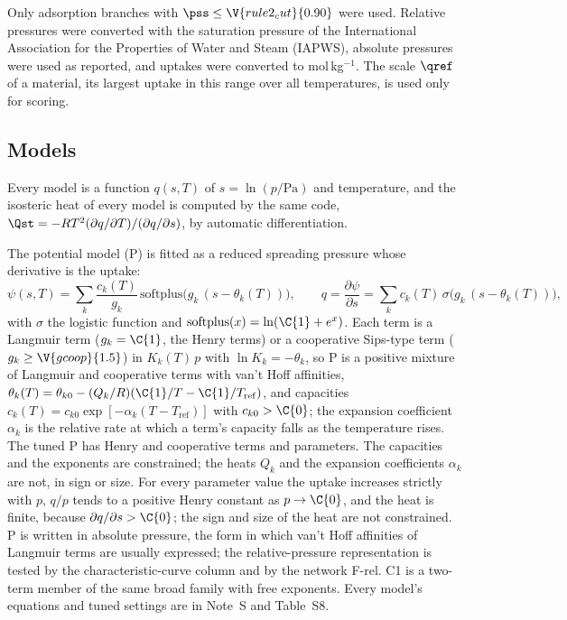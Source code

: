 \documentclass[journal=jcisd8,manuscript=article]{achemso}
\begin{document}
Only adsorption branches with $\pss \le \V{rule2_cut}{0.90}$ were used. Relative pressures were converted with the
saturation pressure of the International Association for the Properties of Water and Steam
(IAPWS)\cite{wagner1993}, absolute pressures were used as reported, and uptakes were converted to
mol\,kg$^{-1}$. The scale $\qref$ of a material, its largest uptake in this range over all temperatures, is used
only for scoring.

\subsection*{Models}

Every model is a function $q(s,T)$ of $s = \ln(p/\mathrm{Pa})$ and temperature, and the isosteric heat of every
model is computed by the same code, $\Qst = -RT^{2}(\partial q/\partial T)/(\partial q/\partial s)$, by automatic
differentiation.

The potential model (P) is fitted as a reduced spreading pressure whose derivative is the uptake:
\begin{equation}
\psi(s,T) = \sum_k \frac{c_k(T)}{g_k}\,\mathrm{softplus}\bigl(g_k\,(s-\theta_k(T))\bigr),
\qquad q = \frac{\partial\psi}{\partial s} = \sum_k c_k(T)\,\sigma\bigl(g_k\,(s-\theta_k(T))\bigr),
\end{equation}
with $\sigma$ the logistic function and $\mathrm{softplus}(x) = \ln(\C{1} + e^{x})$. Each term is a Langmuir term ($g_k = \C{1}$, the Henry terms) or a cooperative
Sips-type term ($g_k \ge \V{gcoop}{1.5}$) in $K_k(T)\,p$ with $\ln K_k = -\theta_k$, so P is a positive mixture of
Langmuir and cooperative terms with van't Hoff affinities,
$\theta_k(T) = \theta_{k0} - (Q_k/R)(\C{1}/T - \C{1}/T_{\mathrm{ref}})$, and capacities
$c_k(T) = c_{k0}\exp[-\alpha_k(T - T_{\mathrm{ref}})]$ with $c_{k0} > \C{0}$; the expansion coefficient
$\alpha_k$ is the relative rate at which a term's capacity falls as the temperature rises. The tuned P has
 Henry and  cooperative terms and  parameters. The capacities and the
exponents are constrained; the heats $Q_k$ and the expansion coefficients $\alpha_k$ are not, in sign or size. For
every parameter value the uptake increases strictly with $p$, $q/p$ tends to a positive Henry constant as
$p \to \C{0}$, and the heat is finite, because $\partial q/\partial s > \C{0}$; the sign and size of the heat are not
constrained. P is written in absolute pressure, the form in which van't Hoff affinities of Langmuir terms are
usually expressed; the relative-pressure representation is tested by the characteristic-curve column and by the
network F-rel. C1 is a two-term member of the same broad family with free exponents. Every model's equations and
tuned settings are in Note~S and Table~S8.
\end{document}
